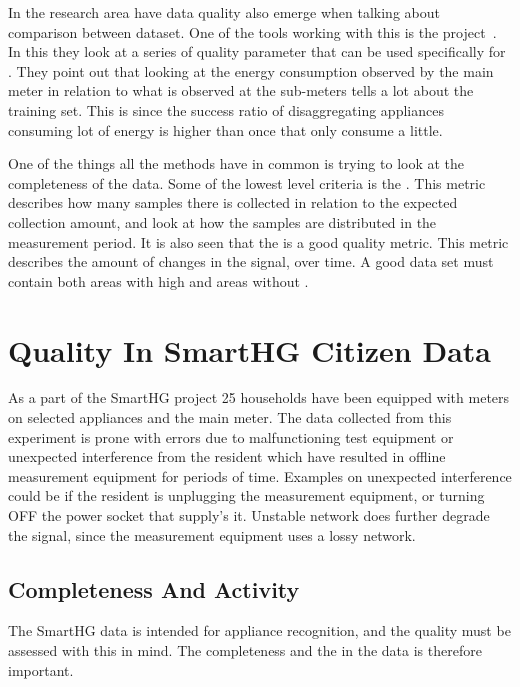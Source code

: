 In the  research area have data quality also emerge when talking about comparison between dataset. One of the tools working with this is the  project~\citep{RefWorks:21}. In this they look at a series of quality parameter that can be used specifically for . They point out that looking at the energy consumption observed by the main meter in relation to what is observed at the sub-meters tells a lot about the training set. This is since the success ratio of disaggregating appliances consuming lot of energy is higher than once that only consume a little. 

One of the things all the methods have in common is trying to look at the completeness of the data. Some of the lowest level criteria is the . This metric describes how many samples there is collected in relation to the expected collection amount, and look at how the samples are distributed in the measurement period. It is also seen that the  is a good quality metric. This metric describes the amount of changes in the signal, over time. A good data set must contain both areas with high  and areas without . 

\newpage

\section{Quality In SmartHG Citizen Data}
As a part of the SmartHG project 25 households have been equipped with meters on selected appliances and the main meter. The data collected from this experiment is prone with errors due to malfunctioning test equipment or unexpected interference from the resident which have resulted in offline measurement equipment for periods of time. Examples on unexpected interference could be if the resident is unplugging the measurement equipment, or turning OFF the power socket that supply's it. Unstable network does further degrade the signal, since the measurement equipment uses a lossy network. 

\subsection{Completeness And Activity}
The SmartHG data is intended for appliance recognition, and the quality must be assessed with this in mind. The completeness and the  in the data is therefore important. 

